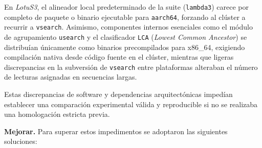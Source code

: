 \documentclass[12pt,oneside,spanish]{book}
\begin{document}
\begin{enumerate}
        En \textit{LotuS3}, el alineador local predeterminado de la suite (\texttt{lambda3}) carece por completo de paquete o binario ejecutable para \texttt{aarch64}, forzando al clúster a recurrir a \texttt{vsearch}. Asimismo, componentes internos esenciales como el módulo de agrupamiento \texttt{usearch} y el clasificador \texttt{LCA} (\textit{Lowest Common Ancestor}) se distribuían únicamente como binarios precompilados para x86\_64, exigiendo compilación nativa desde código fuente en el clúster, mientras que ligeras discrepancias en la subversión de \texttt{vsearch} entre plataformas alteraban el número de lecturas asignadas en secuencias largas.
        
        Estas discrepancias de software y dependencias arquitectónicas impedían establecer una comparación experimental válida y reproducible si no se realizaba una homologación estricta previa.
    \end{enumerate}
    
    \textbf{Mejorar.} Para superar estos impedimentos se adoptaron las siguientes soluciones:
    
\end{document}

